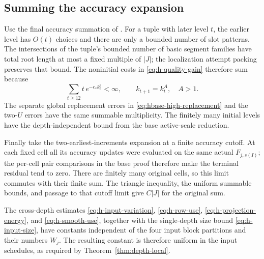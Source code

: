 \subsection{Summing the accuracy expansion}

Use the final accuracy summation of
\cite[Section~10, Summing the base expansion]{H}.  For a tuple
with later level \(t\), the earlier level has \(O(t)\) choices
and there are only a bounded number of slot patterns.  The
intersections of the tuple's bounded number of basic segment
families have total root length at most a fixed multiple of
\(|J|\); the localization attempt packing preserves that bound.
The noninitial costs in \eqref{eq:h-quality-gain} therefore
sum because
\[
 \sum_{t\ge12}t\,e^{-c_*k_t^\theta}<\infty,\qquad
 k_{t+1}=k_t^A,\quad A>1.
\]
The separate global replacement errors in
\eqref{eq:hbase-high-replacement} and the two-\(U\) errors have the
same summable multiplicity.  The
finitely many initial levels have the depth-independent bound
from the base active-scale reduction.

Finally take the two-earliest-increments expansion at a finite
accuracy cutoff.  At each fixed cell all its accuracy updates
were evaluated on the same actual \(F_{j,s(I)}\); the per-cell
pair comparisons in the base proof therefore make the terminal
residual tend to zero.  There are finitely many original cells,
so this limit commutes with their finite sum.  The triangle
inequality, the uniform summable bounds, and passage to that
cutoff limit give \(C|J|\) for the original sum.

The cross-depth estimates
\eqref{eq:h-input-variation}, \eqref{eq:h-row-use},
\eqref{eq:h-projection-energy}, and \eqref{eq:h-smooth-use},
together with the single-depth size bound
\eqref{eq:h-input-size}, have constants independent of the four
input block partitions and their numbers \(W_j\).  The resulting
constant is therefore uniform in the input schedules, as
required by Theorem~\ref{thm:depth-local}.
